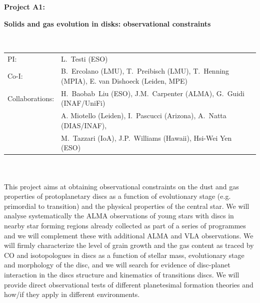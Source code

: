 \documentclass[10pt,fleqn,twoside]{article}
\newcommand{\Tcol}{\color{blue}}
\begin{document}
\newpage


\setcounter{page}{1}

\centerline{\huge\bf\Tcol
%
%
%
%
%
 Project A1: }

\centerline{\huge\bf\Tcol Solids and gas evolution in disks:
observational constraints}

%
%
%
%
%
\vskip1.0cm


\\
\begin{tabular}{ll}
{\textsf{PI:}}                   & L.~Testi (ESO)\\
{\textsf{Co-I:}}                & B.~Ercolano (LMU), T.~Preibisch (LMU), T.~Henning (MPIA), E. van Dishoeck (Leiden, MPE)\\
{\textsf{Collaborations:}}      & H.~Baobab~Liu (ESO),  J.M.~Carpenter (ALMA), G.~Guidi (INAF/UniFi)\\
                                & A. Miotello (Leiden),  I.~Pascucci (Arizona), A.~Natta (DIAS/INAF),\\
                                &  M.~Tazzari (IoA), J.P.~Williams (Hawaii), Hsi-Wei Yen (ESO)\\

\end{tabular}


\vspace{1em}
 \\

\vspace{1em}
\\

This project aims at obtaining observational constraints on the dust and gas 
properties of protoplanetary discs as a function of evolutionary stage (e.g. primordial to transition) and 
the physical properties of the central star. We will analyse systematically
the ALMA observations of young stars with discs in nearby star forming regions already collected as part of a series of programmes and we will complement these with additional 
ALMA and VLA observations. We will firmly characterize the level of grain growth and the gas content as traced by CO and isotopologues in discs as a function of stellar mass, evolutionary stage and morphology of the disc, and we will search for evidence of disc-planet interaction in the discs structure and kinematics of transitions discs. We will provide direct observational tests of different planetesimal formation theories and how/if they apply in different environments.
\end{document}

